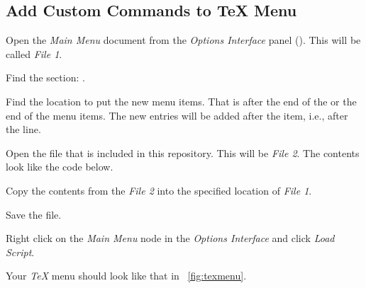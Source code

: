 \subsection{Add Custom Commands to TeX Menu}
\label{sec:addmenuitems}
\begin{numberedlist}
	\item Open the \textit{Main Menu} document from the \textit{Options Interface} panel ().  This will be called \emph{File 1}.
	\item Find the section: .
	\item Find the location to put the new menu items.  That is after the end of the  or the end of the  menu items.  The new entries will be added after the item, i.e., after the  line.
	\item Open the file  that is included in this repository.  This will be \emph{File 2}.  The contents look like the code below.
	\item Copy the contents from the \emph{File 2} into the specified location of \emph{File 1}.
	\item Save the file.
	\item Right click on the \emph{Main Menu} node in the \emph{Options Interface} and click \emph{Load Script}.
	\item Your \emph{TeX} menu should look like that in \figurename~\ref{fig:texmenu}.
\end{numberedlist}

